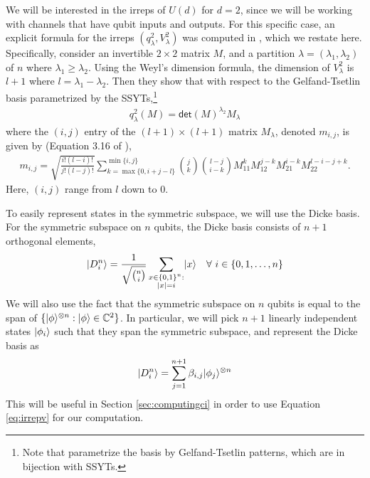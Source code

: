 \documentclass[11pt]{article}
\DeclarePairedDelimiter\ket{\lvert}{\rangle}
\begin{document}
We will be interested in the irreps of $U(d)$ for $d = 2$, since we will be working with channels that have qubit inputs and outputs. For this specific case, an explicit formula for the irreps $(q^2_{\lambda}, V^2_{\lambda})$ was computed in \cite{bhalerao2025improvingquantumcommunicationrates}, which we restate here. Specifically, consider an invertible $2 \times 2$ matrix $M$, and a partition $\lambda = (\lambda_1, \lambda_2)$ of $n$ where $\lambda_1 \geq \lambda_2$. Using the Weyl's dimension formula, the dimension of $V^2_{\lambda}$ is $l+1$ where $l = \lambda_1 - \lambda_2$. Then they show that with respect to the Gelfand-Tsetlin basis parametrized by the SSYTs,\footnote{Note that \cite{bhalerao2025improvingquantumcommunicationrates} parametrize the basis by Gelfand-Tsetlin patterns, which are in bijection with SSYTs.}
\begin{align*}
    q^2_{\lambda}(M) = \mathsf{det}(M)^{\lambda_2} M_{\lambda}
\end{align*}
where the $(i,j)$ entry of the $(l+1) \times (l+1)$ matrix $M_\lambda$, denoted $m_{i,j}$, is given by (Equation 3.16 of \cite{bhalerao2025improvingquantumcommunicationrates}),
\begin{align}\label{eq:irrepv}
    m_{i, j} = \sqrt{\frac{i! (l - i)!}{j!(l-j)!}}
         \sum_{k = \max\{0, i+j-l\}}^{\min\{i, j\}} \binom{j}{k}\binom{l-j}{i-k} M_{11}^k M_{12}^{j-k}M_{21}^{i-k}M_{22}^{l-i-j+k}.
\end{align}
Here, $(i, j)$ range from $l$ down to $0$.

To easily represent states in the symmetric subspace, we will use the Dicke basis. For the symmetric subspace on $n$ qubits, the Dicke basis consists of $n+1$ orthogonal elements,
\begin{align*}
    \ket{D^n_i} &= \frac{1}{\sqrt{\binom{n}{i}}} \sum_{\substack{x \in \{0,1\}^n: \\ |x| = i}} \ket{x} &\forall~i \in \{0,1, \ldots, n\}
\end{align*}
We will also use the fact that the symmetric subspace on $n$ qubits is equal to the span of $\{\ket{\phi}^{\otimes n}: \ket{\phi} \in \mathbb{C}^2\}$. In particular, we will pick $n+1$ linearly independent states $\ket{\phi_i}$ such that they span the symmetric subspace, and represent the Dicke basis as
\begin{align*}
    \ket{D_i^n} = \sum_{j=1}^{n+1} \beta_{i,j} \ket{\phi_j}^{\otimes n}
\end{align*}
This will be useful in Section \ref{sec:computingci} in order to use Equation \ref{eq:irrepv} for our computation.
\end{document}
